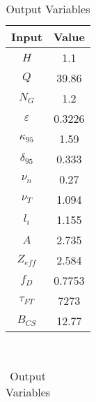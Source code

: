 \begin{table}[b!]
\centering
\caption{DEMO Pulsed Variables}
\hfill
\begin{subtable}[t]{0.4\textwidth}
\centering
\caption{Input Variables} ~\\
\begin{tabular}{ c|c }

Input            & Value           \\
\hline
$H$              & 1.1             \\
$Q$              & 39.86           \\
$N_{G}$          & 1.2             \\
$\varepsilon$       & 0.3226          \\
$\kappa_{95}$    & 1.59            \\
$\delta_{95}$    & 0.333           \\
$\nu_{n}$        & 0.27            \\
$\nu_{T}$        & 1.094           \\
$l_{i}$          & 1.155           \\
$A$              & 2.735           \\
$Z_{eff}$        & 2.584           \\
$f_{D}$          & 0.7753          \\
$\tau_{FT}$      & 7273          \\
$B_{CS}$         & 12.77           \\

\end{tabular}
\end{subtable}
\hfill
\begin{subtable}[t]{0.5\textwidth}
\centering
\caption{Output Variables} ~\\
\begin{tabular}{ c|c|c|c }


\end{tabular}
\end{subtable}
\end{table}

